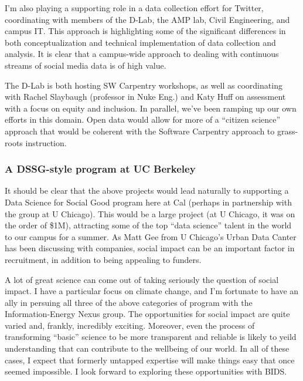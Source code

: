I'm also playing a supporting role in a data collection effort for Twitter,
coordinating with members of the D-Lab, the AMP lab, Civil Engineering, and
campus IT. This approach is highlighting some of the significant differences in
both conceptualization and technical implementation of data collection and
analysis.  It is clear that a campus-wide approach to dealing with continuous
streams of social media data is of high value.

The D-Lab is both hosting SW Carpentry workshops, as well as
coordinating with Rachel Slaybaugh (professor in Nuke Eng.) and Katy
Huff on assessment with a focus on equity and inclusion. In parallel,
we've been ramping up our own efforts in this domain. Open data would
allow for more of a “citizen science” approach that would be coherent
with the Software Carpentry approach to grass-roots instruction.


\subsubsection*{A DSSG-style program at UC Berkeley}

It should be clear that the above projects would lead naturally to supporting a
Data Science for Social Good program here at Cal (perhaps in partnership with
the group at U Chicago). This would be a large project (at U Chicago, it was on
the order of \$1M), attracting some of the top “data science” talent in the
world to our campus for a summer. As Matt Gee from U Chicago's Urban Data Canter
has been discussing with companies, social impact can be an important factor in
recruitment, in addition to being appealing to funders.

A lot of great science can come out of taking seriously the question of social
impact. I have a particular focus on climate change, and I'm fortunate to have
an ally in persuing all three of the above categories of program with the
Information-Energy Nexus group. The opportunities for social impact are quite
varied and, frankly, incredibly exciting. Moreover, even the process of
transforming “basic” science to be more transparent and reliable is likely to
yeild understanding that can contribute to the wellbeing of our world. In all of
these cases, I expect that formerly untapped expertise will make things easy
that once seemed impossible. I look forward to exploring these opportunities
with BIDS.


